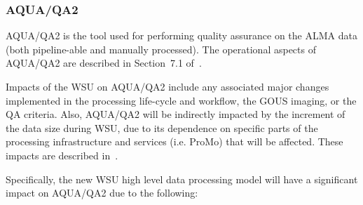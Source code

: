 \subsubsection{AQUA/QA2}

AQUA/QA2 is the tool used for performing quality assurance on the ALMA data (both pipeline-able and manually processed). The operational aspects of AQUA/QA2 are described in Section~7.1 of~\cite{dpda}.

Impacts of the WSU on AQUA/QA2 include any associated major changes implemented in the processing life-cycle and workflow, the GOUS imaging, or the QA criteria. Also, AQUA/QA2 will be indirectly impacted by the increment of the data size during WSU, due to its dependence on specific parts of the processing infrastructure and services (i.e. ProMo) that will be affected. These impacts are described in~\cite{dp}.

Specifically, the new WSU high level data processing model will have a significant impact on AQUA/QA2 due to the following:

